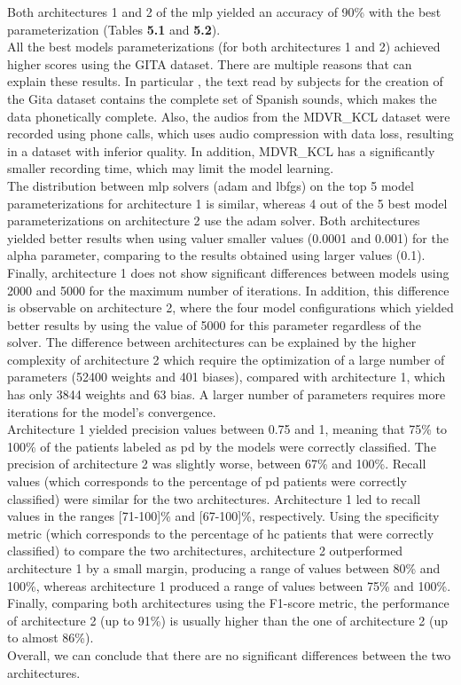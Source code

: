 Both architectures 1 and 2 of the \gls{mlp} yielded an accuracy of 90\% with the best parameterization (Tables \textbf{5.1} and \textbf{5.2}). \\
All the best models parameterizations (for both architectures 1 and 2) achieved higher scores using the GITA dataset. There are multiple reasons that can explain these results. In particular , the text read by subjects for the creation of the Gita dataset contains the complete set of Spanish sounds, which makes the data phonetically complete. Also, the audios from the MDVR\_KCL dataset were recorded using phone calls, which uses audio compression with data loss, resulting in a dataset with inferior quality. In addition, MDVR\_KCL has a significantly smaller recording time, which may limit the model learning. \\
The distribution between \gls{mlp} solvers (adam and lbfgs) on the top 5 model parameterizations for architecture 1 is similar, whereas 4 out of the 5 best model parameterizations on architecture 2 use the adam solver. Both architectures yielded better results when using valuer smaller values (0.0001 and 0.001) for the alpha parameter, comparing to the results obtained using larger values (0.1). Finally, architecture 1 does not show significant differences between models using 2000 and 5000 for the maximum number of iterations. In addition, this difference is observable on architecture 2, where the four model configurations which yielded better results by using the value of 5000 for this parameter regardless of the solver. The difference between architectures can be explained by the higher complexity of architecture 2 which require the optimization of a large number of parameters (52400 weights and 401 biases), compared with architecture 1, which has only 3844 weights and 63 bias. A larger number of parameters requires more iterations for the model's convergence. \\
Architecture 1 yielded precision values between 0.75 and 1, meaning that 75\% to 100\% of the patients labeled as \gls{pd} by the models were correctly classified. The precision of architecture 2 was slightly worse, between 67\% and 100\%. Recall values (which corresponds to the percentage of \gls{pd} patients were correctly classified) were similar for the two architectures. Architecture 1 led to recall values in the ranges [71-100]\% and [67-100]\%, respectively. Using the specificity metric (which corresponds to the percentage of \gls{hc} patients that were correctly classified) to compare the two architectures, architecture 2 outperformed architecture 1 by a small margin, producing a range of values between 80\% and 100\%, whereas architecture 1 produced a range of values between 75\% and 100\%. Finally, comparing both architectures using the F1-score metric, the performance of architecture 2 (up to 91\%) is usually higher than the one of architecture 2 (up to almost 86\%). \\
Overall, we can conclude that there are no significant differences between the two architectures.

